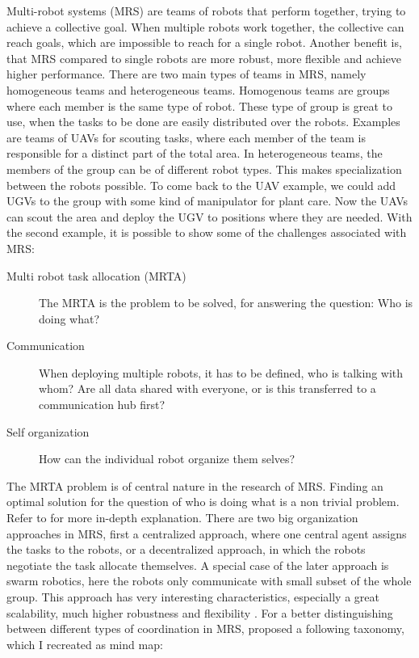         Multi-robot systems (MRS) are teams of robots that perform together, trying to achieve a collective goal. When multiple robots work together, the collective can reach goals, which are impossible to reach for a single robot. Another benefit is, that MRS compared to single robots are more robust, more flexible and achieve higher performance. \cite{Albani2017}
        There are two main types of teams in MRS, namely homogeneous teams and heterogeneous teams. Homogenous teams are groups where each member is the same type of robot. These type of group is great to use, when the tasks to be done are easily distributed over the robots. Examples are teams of UAVs for scouting tasks, where each member of the team is responsible for a distinct part of the total area. 
        In heterogeneous teams, the members of the group can be of different robot types. This makes specialization between the robots possible. To come back to the UAV example, we could add UGVs to the group with some kind of manipulator for plant care. Now the UAVs can scout the area and deploy the UGV to positions where they are needed. 
        With the second example, it is possible to show some of the challenges associated with MRS: \ \begin{description}
            \item[Multi robot task allocation (MRTA)] The MRTA is the problem to be solved, for answering the question: Who is doing what?
            \item[Communication] When deploying multiple robots, it has to be defined, who is talking with whom? Are all data shared with everyone, or is this transferred to a communication hub first?
            \item[Self organization] How can the individual robot organize them selves?  
        \end{description}

        The MRTA problem is of central nature in the research of MRS. Finding an optimal solution for the question of who is doing what is a non trivial problem. Refer to \cite{Gerkey2004} for more in-depth explanation. There are two big organization approaches in MRS, first a centralized approach, where one central agent assigns the tasks to the robots, or a decentralized approach, in which the robots negotiate the task allocate themselves. A special case of the later approach is swarm robotics, here the robots only communicate with small subset of the whole group. This approach has very interesting characteristics, especially a great scalability, much higher robustness and flexibility \cite{Albani2017}.
        For a better distinguishing between different types of coordination in MRS, \cite{Farinelli2004} proposed a following taxonomy, which I recreated as mind map: 

